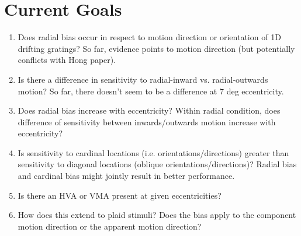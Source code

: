\documentclass[11pt]{article} %
\begin{document}
\section{Current Goals} 
\begin{enumerate}
	\item Does radial bias occur in respect to motion direction or orientation of 1D drifting gratings? So far, evidence points to motion direction (but potentially conflicts with Hong paper).
	\item Is there a difference in sensitivity to radial-inward vs. radial-outwards motion? So far, there doesn't seem to be a difference at 7 deg eccentricity.
	\item Does radial bias increase with eccentricity? Within radial condition, does difference of sensitivity between inwards/outwards motion increase with eccentricity?
	\item Is sensitivity to cardinal locations (i.e. orientations/directions) greater than sensitivity to diagonal locations (oblique orientations/directions)? Radial bias and cardinal bias might jointly result in better performance.
	\item Is there an HVA or VMA present at given eccentricities?
	\item How does this extend to plaid stimuli? Does the bias apply to the component motion direction or the apparent motion direction?
\end{enumerate}

\newpage
\end{document}
